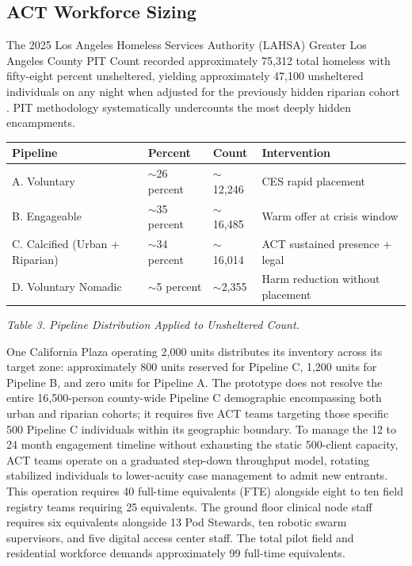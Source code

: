 \documentclass[12pt, letterpaper]{article}
\begin{document}
\subsection{ACT Workforce Sizing}

The 2025 Los Angeles Homeless Services Authority (LAHSA) Greater Los Angeles County PIT Count recorded approximately 75,312 total homeless with fifty-eight percent unsheltered, yielding approximately 47,100 unsheltered individuals on any night when adjusted for the previously hidden riparian cohort \citep{lahsa_count_2025}. PIT methodology systematically undercounts the most deeply hidden encampments.

{\singlespacing
\begin{tabularx}{\textwidth}{@{}lXll@{}}
\toprule
\rowcolor{rowgray}
Pipeline & Percent & Count & Intervention \\
\midrule
A. Voluntary & $\sim$26 percent & $\sim$12,246 & CES rapid placement \\
\rowcolor{rowgray}
B. Engageable & $\sim$35 percent & $\sim$16,485 & Warm offer at crisis window \\
C. Calcified (Urban + Riparian) & $\sim$34 percent & $\sim$16,014 & ACT sustained presence + legal \\
\rowcolor{rowgray}
D. Voluntary Nomadic & $\sim$5 percent & $\sim$2,355 & Harm reduction without placement \\
\bottomrule
\end{tabularx}\par
\vspace{8pt}
\noindent\textit{Table 3. Pipeline Distribution Applied to Unsheltered Count.}
\par}
One California Plaza operating 2,000 units distributes its inventory across its target zone: approximately 800 units reserved for Pipeline C, 1,200 units for Pipeline B, and zero units for Pipeline A. The prototype does not resolve the entire 16,500-person county-wide Pipeline C demographic encompassing both urban and riparian cohorts; it requires five ACT teams targeting those specific 500 Pipeline C individuals within its geographic boundary. To manage the 12 to 24 month engagement timeline without exhausting the static 500-client capacity, ACT teams operate on a graduated step-down throughput model, rotating stabilized individuals to lower-acuity case management to admit new entrants. This operation requires 40 full-time equivalents (FTE) alongside eight to ten field registry teams requiring 25 equivalents. The ground floor clinical node staff requires six equivalents alongside 13 Pod Stewards, ten robotic swarm supervisors, and five digital access center staff. The total pilot field and residential workforce demands approximately 99 full-time equivalents.
\end{document}
